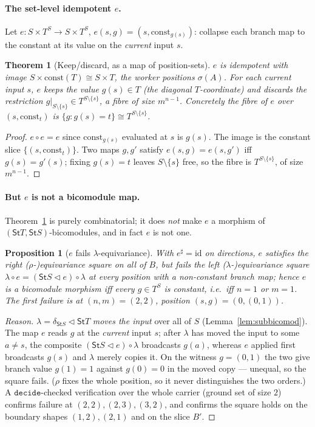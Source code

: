 \documentclass[11pt]{article}
\newcommand{\comp}{\mathbin{\triangleleft}}       %
\newcommand{\St}{\mathsf{St}}                      %
\newcommand{\bk}[1]{{#1}^{\sharp}}                 %
\newcommand{\const}{\mathrm{const}}
\theoremstyle{plain}
\newtheorem{theorem}{Theorem}
\newtheorem{proposition}{Proposition}
\theoremstyle{definition}
\theoremstyle{remark}
\begin{document}
\paragraph{The set-level idempotent $e$.}
Let $e\colon S\times T^S\to S\times T^S$, $e(s,g)=(s,\const_{g(s)})$: collapse each branch
map to the constant at its value on the \emph{current} input $s$.

\begin{theorem}[Keep/discard, as a map of position-sets]\label{thm:retract}
$e$ is idempotent with image $S\times\const(T)\cong S\times T$, the worker positions
$\sigma(A)$. For each current input $s$, $e$ \emph{keeps} the value $g(s)\in T$ (the
diagonal $T$-coordinate) and \emph{discards} the restriction $g|_{S\setminus\{s\}}\in
T^{S\setminus\{s\}}$, a fibre of size $m^{n-1}$. Concretely the fibre of $e$ over
$(s,\const_t)$ is $\{g:g(s)=t\}\cong T^{S\setminus\{s\}}$.
\end{theorem}

\begin{proof}
$e\circ e=e$ since $\const_{g(s)}$ evaluated at $s$ is $g(s)$. The image is the constant
slice $\{(s,\const_t)\}$. Two maps $g,g'$ satisfy $e(s,g)=e(s,g')$ iff $g(s)=g'(s)$; fixing
$g(s)=t$ leaves $S\setminus\{s\}$ free, so the fibre is $T^{S\setminus\{s\}}$, of size
$m^{n-1}$.
\end{proof}

\paragraph{But $e$ is not a bicomodule map.}
Theorem~\ref{thm:retract} is purely combinatorial; it does \emph{not} make $e$ a morphism of
$(\St T,\St S)$-bicomodules, and in fact $e$ is not one.

\begin{proposition}[$e$ fails $\lambda$-equivariance]\label{prop:efail}
With $\bk e=\mathrm{id}$ on directions, $e$ satisfies the right ($\rho$-)equivariance square
on all of $B$, but fails the left ($\lambda$-)equivariance square
$\lambda\circ e=(\St S\comp e)\circ\lambda$ at every position with a non-constant branch map;
hence $e$ is a bicomodule morphism iff every $g\in T^S$ is constant, i.e.\ iff $n=1$ or
$m=1$. The first failure is at $(n,m)=(2,2)$, position $(s,g)=(0,(0,1))$.
\end{proposition}

\begin{proof}[Reason]
$\lambda=\delta_{\St S}\comp\St T$ \emph{moves the input} over all of $S$
(Lemma~\ref{lem:subbicomod}). The map $e$ reads $g$ at the \emph{current} input $s$; after
$\lambda$ has moved the input to some $a\ne s$, the composite $(\St S\comp e)\circ\lambda$
broadcasts $g(a)$, whereas $e$ applied first broadcasts $g(s)$ and $\lambda$ merely copies
it. On the witness $g=(0,1)$ the two give branch value $g(1)=1$ against $g(0)=0$ in the
moved copy --- unequal, so the square fails. ($\rho$ fixes the whole position, so it never
distinguishes the two orders.) A $\mathtt{decide}$-checked verification over the whole carrier
(ground set of size $2$) confirms failure at $(2,2),(2,3),(3,2)$, and confirms the square
holds on the boundary shapes $(1,2),(2,1)$ and on the slice $B'$.
\end{proof}
\end{document}
